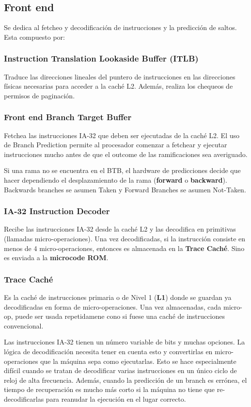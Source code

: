 \subsection{Front end}
Se dedica al fetcheo y decodificación de instrucciones y la predicción de saltos. Esta compuesto por:
\subsubsection*{Instruction Translation Lookaside Buffer (ITLB)}
Traduce las direcciones lineales del puntero de instrucciones en las direcciones físicas necesarias para acceder a la caché L2. Además, realiza los chequeos de permisos de paginación.

\subsubsection*{Front end Branch Target Buffer}\label{sec::Intel::Netburst::frontEnd::btb}
Fetchea las instrucciones IA-32 que deben ser ejecutadas de la caché L2. El uso de Branch Prediction permite al procesador comenzar a fetchear y ejecutar instrucciones mucho antes de que el outcome de las ramificaciones sea averiguado.
	
Si una rama no se encuentra en el BTB, el hardware de predicciones decide que hacer dependiendo el desplazamiennto de la rama (\textbf{forward} o \textbf{backward}). Backwards branches se asumen Taken y Forward Branches se asumen Not-Taken.

\subsubsection*{IA-32 Instruction Decoder}
Recibe las instrucciones IA-32 desde la caché L2 y las decodifica en primitivas (llamadas micro-operaciones). Una vez decodificadas, si la instrucción consiste en menos de 4 micro-operaciones, entonces es almacenada en la \textbf{Trace Caché}. Sino es enviada a la \textbf{microcode ROM}.

\subsubsection*{Trace Caché} 
Es la caché de instrucciones primaria o de Nivel 1 (\textbf{L1}) donde se guardan ya decodificadas en forma de micro-operaciones. Una vez almacenadas, cada micro-op, puede ser usada repetidamene cono si fuese una caché de instrucciones convencional.

Las instrucciones IA-32 tienen un número variable de bits y muchas opciones. La lógica de decodificación necesita tener en cuenta esto y convertirlas en micro-operaciones que la máquina sepa como ejecutarlas. Esto se hace especialmente difícil cuando se tratan de decodificar varias instrucciones en un único ciclo de reloj de alta frecuencia. Además, cuando la predicción de un branch es errónea, el tiempo de recuperación es mucho más corto si la máquina no tiene que re-decodificarlas para reanudar la ejecución en el lugar correcto.
	
